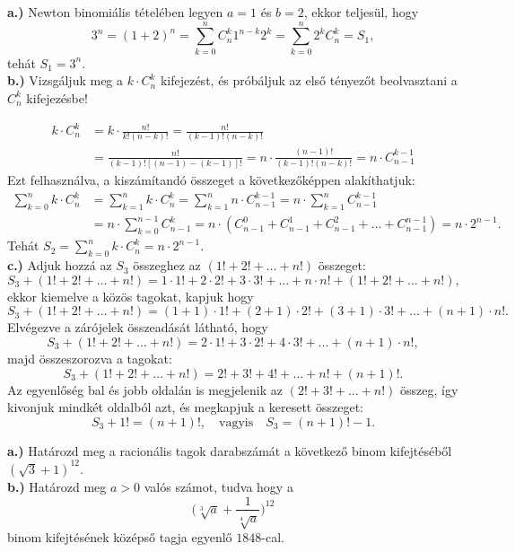 \begin{solution}
\textbf{a.)} Newton binomiális tételében legyen $a=1$ és $b=2$,
ekkor teljesül, hogy 
\[
3^{n}=(1+2)^{n}=\sum_{k=0}^{n}C_{n}^{k}1^{n-k}2^{k}=\sum_{k=0}^{n}2^{k}C_{n}^{k}=S_{1},
\]
tehát $S_{1}=3^{n}$. \\
 \textbf{b.)} Vizsgáljuk meg a $k\cdot C_{n}^{k}$ kifejezést, és
próbáljuk az első tényezőt beolvasztani a $C_{n}^{k}$ kifejezésbe!

\begin{align*}
k\cdot C_{n}^{k} & =k\cdot\frac{n!}{k!(n-k)!}=\frac{n!}{(k-1)!(n-k)!}\\
 & =\frac{n!}{(k-1)![(n-1)-(k-1)]!}=n\cdot\frac{(n-1)!}{(k-1)!(n-k)!}=n\cdot C_{n-1}^{k-1}
\end{align*}
Ezt felhasználva, a kiszámítandó összeget a következőképpen alakíthatjuk:
\begin{align*}
\sum_{k=0}^{n}k\cdot C_{n}^{k} & =\sum_{k=1}^{n}k\cdot C_{n}^{k}=\sum_{k=1}^{n}n\cdot C_{n-1}^{k-1}=n\cdot\sum_{k=1}^{n}C_{n-1}^{k-1}\\
 & =n\cdot\sum_{k=0}^{n-1}C_{n-1}^{k}=n\cdot(C_{n-1}^{0}+C_{n-1}^{1}+C_{n-1}^{2}+\ldots+C_{n-1}^{n-1})=n\cdot2^{n-1}.
\end{align*}
Tehát ${\displaystyle S_{2}=\sum_{k=0}^{n}k\cdot C_{n}^{k}=n\cdot2^{n-1}.}$
\\
 \textbf{c.)} Adjuk hozzá az $S_{3}$ összeghez az $(1!+2!+\ldots+n!)$
összeget: 
\[
S_{3}+(1!+2!+\ldots+n!)=1\cdot1!+2\cdot2!+3\cdot3!+\ldots+n\cdot n!+(1!+2!+\ldots+n!),
\]
ekkor kiemelve a közös tagokat, kapjuk hogy 
\[
S_{3}+(1!+2!+\ldots+n!)=(1+1)\cdot1!+(2+1)\cdot2!+(3+1)\cdot3!+\ldots+(n+1)\cdot n!.
\]
Elvégezve a zárójelek összeadását látható, hogy 
\[
S_{3}+(1!+2!+\ldots+n!)=2\cdot1!+3\cdot2!+4\cdot3!+\ldots+(n+1)\cdot n!,
\]
majd összeszorozva a tagokat: 
\[
S_{3}+(1!+2!+\ldots+n!)=2!+3!+4!+\ldots+n!+(n+1)!.
\]
Az egyenlőség bal és jobb oldalán is megjelenik az $(2!+3!+\ldots+n!)$
összeg, így kivonjuk mindkét oldalból azt, és megkapjuk a keresett
összeget: 
\[
S_{3}+1!=(n+1)!,\quad\text{vagyis}\quad S_{3}=(n+1)!-1.
\]
\end{solution}
\vspace{0.3cm}

\begin{problem}
\textbf{a.)} Határozd meg a racionális tagok darabszámát a következő
binom kifejtéséből $(\sqrt{3}+1)^{12}.$\\
 \textbf{b.)} Határozd meg $a>0$ valós számot, tudva hogy a 
\[
\Big(\sqrt[3]{a}+\frac{1}{\sqrt[4]{a}}\Big)^{12}
\]
binom kifejtésének középső tagja egyenlő $1848$-cal. 
\end{problem}

